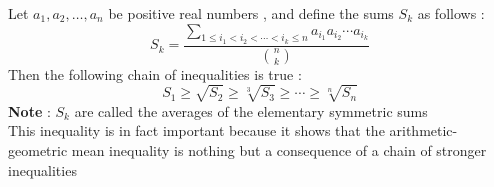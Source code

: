 \documentclass[12pt]{article}
\begin{document}
Let $a_1,a_2,\ldots,a_n$ be positive real numbers , and define the sums
$S_k$ as follows :
$$ S_k = \frac{\displaystyle \sum_{ 1\leq i_1 < i_2 < \cdots < i_k \leq n}a_{i_1} a_{i_2}
\cdots a_{i_k}}{\displaystyle {n \choose k}}$$
Then the following chain of
inequalities is true :
$$ S_1 \geq \sqrt{S_2} \geq \sqrt[3]{S_3} \geq \cdots \geq \sqrt[n]{S_n}$$
\textbf{Note} : $S_k$ are called the averages of the elementary symmetric sums
\\ This inequality is in fact important because it shows that the arithmetic-geometric mean inequality is nothing but a consequence of a chain of stronger inequalities
\end{document}
